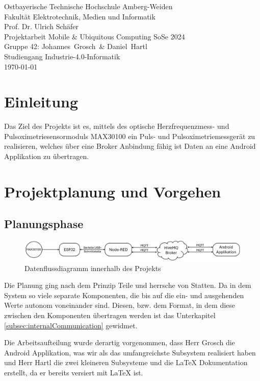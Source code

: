 \documentclass[12pt,oneside]{article}
\newcommand*{\IhrVornameEins}{Johannes}
\newcommand*{\IhrNachnameEins}{Grosch}
\newcommand*{\IhrVornameZwei}{Daniel}
\newcommand*{\IhrNachnameZwei}{Hartl}
\newcommand*{\IhreGruppe}{Gruppe 42}
\newcommand*{\IhrStudiengang}{Industrie-4.0-Informatik}
\newcommand*{\IhreArbeit}{Projektarbeit Mobile \& Ubiquitous Computing SoSe 2024}
\newcommand*{\IhrErstpruefer}{Prof. Dr. Ulrich Schäfer}
\newcommand{\quoteM}[1]{\glqq {#1}\grqq{}}
\begin{document}
  \thispagestyle{empty}
  \originalTeX
  \begin{center}
 	\Large
 	Ostbayerische Technische Hochschule Amberg-Weiden\\
 Fakultät Elektrotechnik, Medien und Informatik\\[.8cm]
 \large \IhrErstpruefer\\[.8cm]
 \Large \IhreArbeit\\[.8cm]
 \large \IhreGruppe: \IhrVornameEins\ \IhrNachnameEins\ \&
 \IhrVornameZwei\ \IhrNachnameZwei\\[.8cm]
 \large Studiengang \IhrStudiengang\\[.8cm]
 \today\\[2.5cm]
  \end{center}
  
  \tableofcontents

  \clearpage
  
  
  \section{Einleitung}
	Das Ziel des Projekts ist es, mittels des optische Herzfrequenzmess- und Pulsoximetriesensormoduls MAX30100\cite{max30100breakout} ein Puls- und Pulsoximetriemessgerät zu realisieren, welches über eine Broker Anbindung fähig ist Daten an eine Android Applikation zu übertragen.


  
  \section{Projektplanung und Vorgehen}
  \subsection{Planungsphase}
	\begin{figure}[tph!]
	 	\includegraphics[width=\textwidth]{kommunikationsdiagramm}
	 	\caption{Datenflussdiagramm innerhalb des Projekts}
	 	\label{fig:datadiagram}
	\end{figure}
	Die Planung ging nach dem Prinzip \quoteM{Divide et impera} Teile und herrsche von Statten. Da in dem System so viele separate Komponenten, die bis auf die ein- und ausgehenden Werte autonom voneinander sind. Diesen, bzw. dem Format, in dem diese zwischen den Komponenten übertragen werden ist das Unterkapitel \ref{subsec:internalCommunication} gewidmet.\par
	Die Arbeitsaufteilung wurde derartig vorgenommen, dass Herr Grosch die Android Applikation, was wir als das umfangreichste Subsystem realisiert haben und Herr Hartl die zwei kleineren Subsysteme und die \LaTeX{} Dokumentation erstellt, da er bereits versiert mit \LaTeX{} ist.
\end{document}
